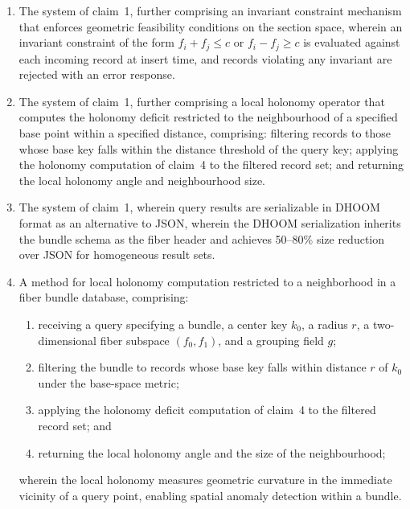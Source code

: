 \documentclass[11pt,letterpaper]{article}
\begin{document}
\begin{enumerate}
\item The system of claim~1, further comprising an invariant constraint mechanism that enforces geometric feasibility conditions on the section space, wherein an invariant constraint of the form $f_i + f_j \leq c$ or $f_i - f_j \geq c$ is evaluated against each incoming record at insert time, and records violating any invariant are rejected with an error response.

\item The system of claim~1, further comprising a local holonomy operator that computes the holonomy deficit restricted to the neighbourhood of a specified base point within a specified distance, comprising: filtering records to those whose base key falls within the distance threshold of the query key; applying the holonomy computation of claim~4 to the filtered record set; and returning the local holonomy angle and neighbourhood size.

\item The system of claim~1, wherein query results are serializable in DHOOM format as an alternative to JSON, wherein the DHOOM serialization inherits the bundle schema as the fiber header and achieves 50--80\% size reduction over JSON for homogeneous result sets.

\item A method for local holonomy computation restricted to a neighborhood in a fiber bundle database, comprising:
\begin{enumerate}[label=(\alph*)]
  \item receiving a query specifying a bundle, a center key $k_0$, a radius $r$, a two-dimensional fiber subspace $(f_0, f_1)$, and a grouping field $g$;
  \item filtering the bundle to records whose base key falls within distance $r$ of $k_0$ under the base-space metric;
  \item applying the holonomy deficit computation of claim~4 to the filtered record set; and
  \item returning the local holonomy angle and the size of the neighbourhood;
\end{enumerate}
wherein the local holonomy measures geometric curvature in the immediate vicinity of a query point, enabling spatial anomaly detection within a bundle.


\end{enumerate}
\end{document}
